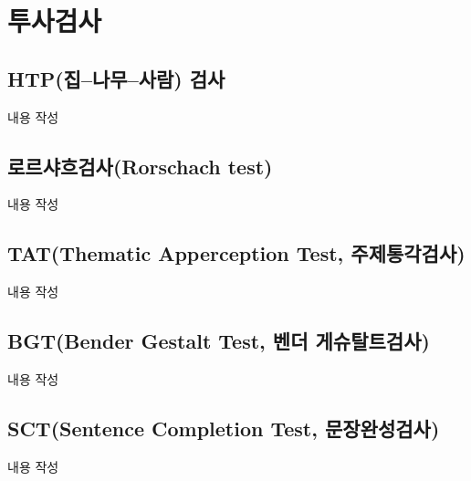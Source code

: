 \section{투사검사}

\subsection{HTP(집–나무–사람) 검사}
내용 작성

\subsection{로르샤흐검사(Rorschach test)}
내용 작성

\subsection{TAT(Thematic Apperception Test, 주제통각검사)}
내용 작성

\subsection{BGT(Bender Gestalt Test, 벤더 게슈탈트검사)}
내용 작성

\subsection{SCT(Sentence Completion Test, 문장완성검사)}
내용 작성
